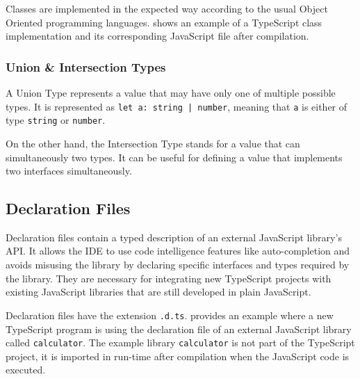Classes are implemented in the expected way according to the usual Object Oriented programming languages.  shows an example of a TypeScript class implementation and its corresponding JavaScript file after compilation.



\subsubsection{Union \& Intersection Types}
A Union Type represents a value that may have only one of multiple possible types. It is represented as \texttt{let a: string | number}, meaning that \texttt{a} is either of type \texttt{string} or \texttt{number}.

On the other hand, the Intersection Type stands for a value that can simultaneously two types. It can be useful for defining a value that implements two interfaces simultaneously.

\subsection{Declaration Files} \label{sec:declaration-files-background}
Declaration files contain a typed description of an external JavaScript library's API. It allows the IDE to use code intelligence features like auto-completion and avoids misusing the library by declaring specific interfaces and types required by the library. They are necessary for integrating new TypeScript projects with existing JavaScript libraries that are still developed in plain JavaScript.

Declaration files have the extension \texttt{.d.ts}.  provides an example where a new TypeScript program is using the declaration file of an external JavaScript library called \texttt{calculator}. The example  library \texttt{calculator} is not part of the TypeScript project, it is imported in run-time after compilation when the JavaScript code is executed.



